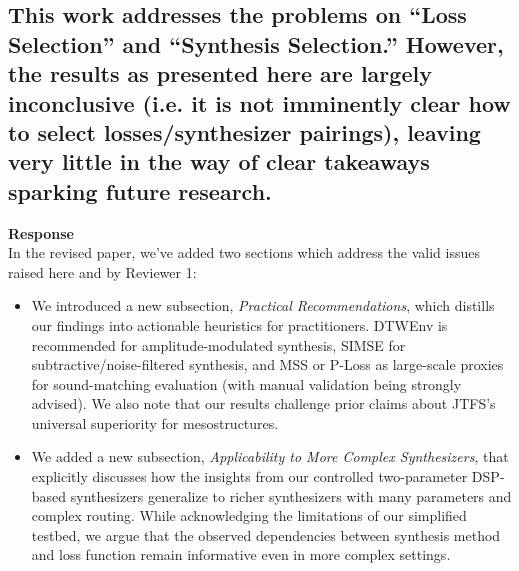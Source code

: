 \documentclass[11pt]{article}
\begin{document}
\subsection*{This work addresses the problems on ``Loss Selection'' and ``Synthesis Selection.''  However, the results as presented here are largely inconclusive (i.e. it is not imminently clear how to select losses/synthesizer pairings), leaving very little in the way of clear takeaways sparking future research.}

\noindent\textbf{Response} \\
In the revised paper, we've added two sections which address the valid issues raised here and by Reviewer 1:
\begin{itemize}
  \item We introduced a new subsection, \emph{Practical Recommendations}, which distills our findings into actionable heuristics for practitioners. DTWEnv is recommended for amplitude-modulated synthesis, SIMSE for subtractive/noise-filtered synthesis, and MSS or P-Loss as large-scale proxies for sound-matching evaluation (with manual validation being strongly advised). We also note that our results challenge prior claims about JTFS’s universal superiority for mesostructures.
  \item We added a new subsection, \emph{Applicability to More Complex Synthesizers}, that explicitly discusses how the insights from our controlled two-parameter DSP-based synthesizers generalize to richer synthesizers with many parameters and complex routing. While acknowledging the limitations of our simplified testbed, we argue that the observed dependencies between synthesis method and loss function remain informative even in more complex settings.
\end{itemize}
\end{document}
